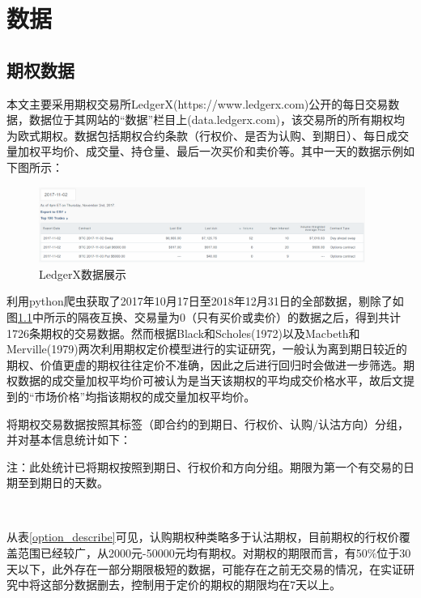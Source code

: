 \chapter{数据}
\section{期权数据}
\par{    
本文主要采用期权交易所LedgerX(https://www.ledgerx.com)公开的每日交易数据，数据位于其网站的“数据”栏目上(data.ledgerx.com)，该交易所的所有期权均为欧式期权。数据包括期权合约条款（行权价、是否为认购、到期日）、每日成交量加权平均价、成交量、持仓量、最后一次买价和卖价等。其中一天的数据示例如下图所示：
\begin{figure}[H]
\begin{small}
\begin{center}
\includegraphics[width=0.95\textwidth]{figures/data_example.png}
\end{center}
\caption{LedgerX数据展示}
\label{data_example}
\end{small}
\end{figure}
利用python爬虫获取了2017年10月17日至2018年12月31日的全部数据，剔除了如图\ref{data_example}中所示的隔夜互换、交易量为0（只有买价或卖价）的数据之后，得到共计1726条期权的交易数据。然而根据Black和Scholes(1972)\cite{J-1972}以及Macbeth和Merville(1979)\cite{Jame-1979}两次利用期权定价模型进行的实证研究，一般认为离到期日较近的期权、价值更虚的期权往往定价不准确，因此之后进行回归时会做进一步筛选。期权数据的成交量加权平均价可被认为是当天该期权的平均成交价格水平，故后文提到的“市场价格”均指该期权的成交量加权平均价。
}

\par{
将期权交易数据按照其标签（即合约的到期日、行权价、认购/认沽方向）分组，并对基本信息统计如下：
}
\par{
    \begin{center}
        \begin{threeparttable}[H]
            \centering
            \caption{期权信息描述性统计}
            \label{option_describe}
            
            \begin{tablenotes}
                \footnotesize
                \item 注：此处统计已将期权按照到期日、行权价和方向分组。期限为第一个有交易的日期至到期日的天数。
            \end{tablenotes}
            \end{threeparttable}
    \end{center}
}
~\\
\par{
从表\ref{option_describe}可见，认购期权种类略多于认沽期权，目前期权的行权价覆盖范围已经较广，从2000元-50000元均有期权。对期权的期限而言，有50$\%$位于30天以下，此外存在一部分期限极短的数据，可能存在之前无交易的情况，在实证研究中将这部分数据删去，控制用于定价的期权的期限均在7天以上。
}

